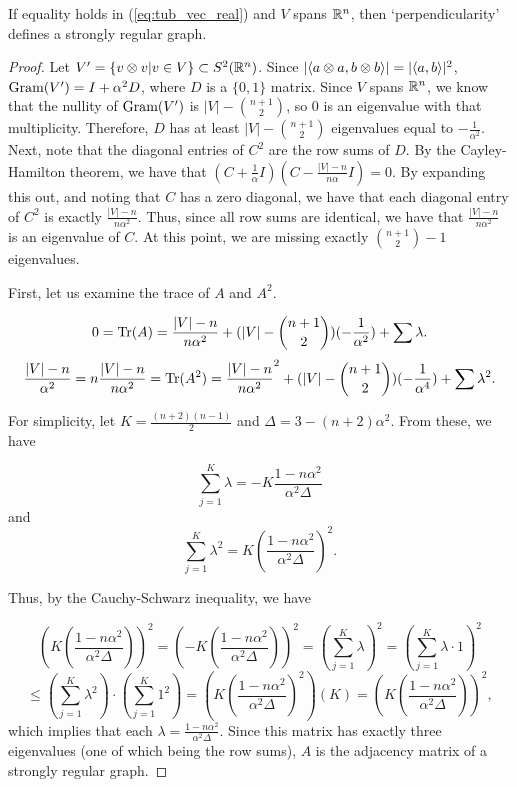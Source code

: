 \begin{theorem}\label{th:vecs_to_srg}
 If equality holds in (\ref{eq:tub_vec_real}) and $V$ spans $\mathbb{R}^n$, then `perpendicularity' defines a strongly regular graph.

 \begin{proof}
  Let $V' = \{v \otimes v | v \in V\} \subset S^2(\mathbb{R}^n)$. Since $| \langle a \otimes a , b \otimes b \rangle | = | \langle a , b \rangle |^2$, $\text{Gram}(V') = I + \alpha^2D$, where $D$ is a $\{0,1\}$ matrix. Since $V$ spans $\mathbb{R}^n$, we know that the nullity of $\text{Gram}(V')$ is $|V| - \binom{n+1}{2}$, so 0 is an eigenvalue with that multiplicity. Therefore, $D$ has at least $|V| - \binom{n+1}{2}$ eigenvalues equal to $-\frac{1}{\alpha^2}$. Next, note that the diagonal entries of $C^2$ are the row sums of $D$. By the Cayley-Hamilton theorem, we have that $\left(C+\frac{1}{\alpha}I\right)\left(C-\frac{|V|-n}{n\alpha}I\right) = 0$. By expanding this out, and noting that $C$ has a zero diagonal, we have that each diagonal entry of $C^2$ is exactly $\frac{|V|-n}{n\alpha^2}$. Thus, since all row sums are identical, we have that $\frac{|V|-n}{n\alpha^2}$ is an eigenvalue of $C$. At this point, we are missing exactly $\binom{n+1}{2} - 1$ eigenvalues.

  First, let us examine the trace of $A$ and $A^2$.

   $$0 = \text{Tr}(A) = \frac{|V|-n}{n\alpha^2} + (|V| - \binom{n+1}{2})(-\frac{1}{\alpha^2}) + \sum\lambda.$$
   $$\frac{|V|-n}{\alpha^2} = n\frac{|V|-n}{n\alpha^2} = \text{Tr}(A^2) = \frac{|V|-n}{n\alpha^2}^2 + (|V| - \binom{n+1}{2})(-\frac{1}{\alpha^4}) + \sum\lambda^2.$$
  
  For simplicity, let $K = \frac{(n+2)(n-1)}{2}$ and $\Delta = 3-(n+2)\alpha^2$. From these, we have

  $$\sum_{j=1}^{K} \lambda = -K\frac{1-n\alpha^2}{\alpha^2\Delta}$$ and
  $$\sum_{j=1}^{K} \lambda^2 = K\left(\frac{1-n\alpha^2}{\alpha^2\Delta}\right)^2.$$

  Thus, by the Cauchy-Schwarz inequality, we have

  $$\left(K\left(\frac{1-n\alpha^2}{\alpha^2\Delta}\right)\right)^2 = 
  \left(-K\left(\frac{1-n\alpha^2}{\alpha^2\Delta}\right)\right)^2 = 
  \left(\sum_{j=1}^{K} \lambda\right)^2 =
  \left(\sum_{j=1}^{K} \lambda \cdot 1\right)^2 $$  $$ \leq
  \left(\sum_{j=1}^{K} \lambda^2\right)\cdot\left(\sum_{j=1}^{K} 1^2 \right) =
  \left(K\left(\frac{1-n\alpha^2}{\alpha^2\Delta}\right)^2\right)\left(K\right) =
  \left(K\left(\frac{1-n\alpha^2}{\alpha^2\Delta}\right)\right)^2,$$
 which implies that each $\lambda = \frac{1-n\alpha^2}{\alpha^2\Delta}$. Since this matrix has exactly three eigenvalues (one of which being the row sums), $A$ is the adjacency matrix of a strongly regular graph.

 \end{proof}

\end{theorem}

